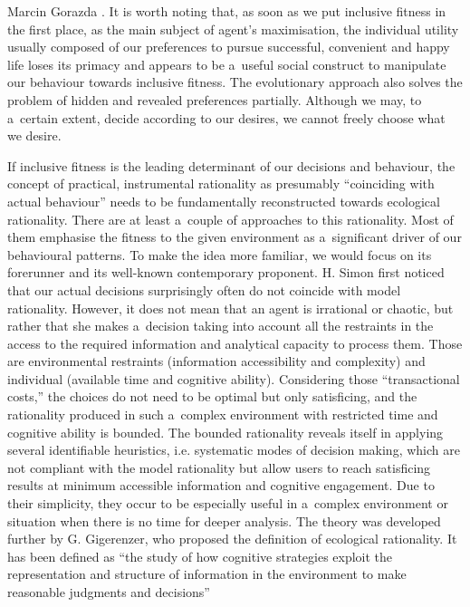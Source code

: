 \begin{artengenv}{Marcin Gorazda}
\parencite[][]{mouden_what_2012}. %
 It is worth noting that, as soon as we put inclusive fitness in the first place, as the main subject of agent's maximisation, the individual utility usually composed of our preferences to pursue successful, convenient and happy life loses its primacy and appears to be a~useful social construct to manipulate our behaviour towards inclusive fitness. The evolutionary approach also solves the problem of hidden and revealed preferences partially. Although we may, to a~certain extent, decide according to our desires, we cannot freely choose what we desire.

If inclusive fitness is the leading determinant of our decisions and behaviour, the concept of practical, instrumental rationality as presumably ``coinciding with actual behaviour'' needs to be fundamentally reconstructed towards ecological rationality. There are at least a~couple of approaches to this rationality. Most of them emphasise the fitness to the given environment as a~significant driver of our behavioural patterns. To make the idea more familiar, we would focus on its forerunner and its well-known contemporary proponent. H. Simon
\parencite*[][]{simon_behavioral_1955} %
 first noticed that our actual decisions surprisingly often do not coincide with model rationality. However, it does not mean that an agent is irrational or chaotic, but rather that she makes a~decision taking into account all the restraints in the access to the required information and analytical capacity to process them. Those are environmental restraints (information accessibility and complexity) and individual (available time and cognitive ability). Considering those ``transactional costs,'' the choices do not need to be optimal but only satisficing, and the rationality produced in such a~complex environment with restricted time and cognitive ability is bounded. The bounded rationality reveals itself in applying several identifiable heuristics, i.e. systematic modes of decision making, which are not compliant with the model rationality but allow users to reach satisficing results at minimum accessible information and cognitive engagement. Due to their simplicity, they occur to be especially useful in a~complex environment or situation when there is no time for deeper analysis. The theory was developed further by G. Gigerenzer, who proposed the definition of ecological rationality. It has been defined as ``the study of how cognitive strategies exploit the representation and structure of information in the environment to make reasonable judgments and decisions'' 

\end{artengenv}
